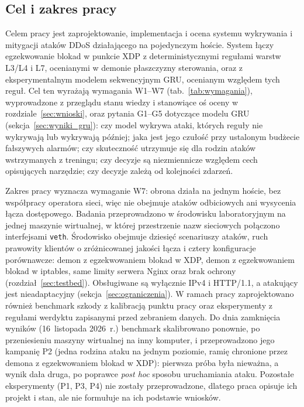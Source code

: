 \documentclass[a4paper,12pt]{article}
\begin{document}
\subsection{Cel i zakres pracy}
Celem pracy jest zaprojektowanie, implementacja i ocena systemu wykrywania i mitygacji ataków DDoS działającego na pojedynczym hoście. System łączy egzekwowanie blokad w punkcie XDP z deterministycznymi regułami warstw L3/L4 i L7, ocenianymi w demonie płaszczyzny sterowania, oraz z eksperymentalnym modelem sekwencyjnym GRU, ocenianym względem tych reguł. Cel ten wyrażają wymagania W1--W7 (tab.~\ref{tab:wymagania}), wyprowadzone z przeglądu stanu wiedzy i stanowiące oś oceny w rozdziale~\ref{sec:wnioski}, oraz pytania G1--G5 dotyczące modelu GRU (sekcja~\ref{sec:wyniki_gru}): czy model wykrywa ataki, których reguły nie wykrywają lub wykrywają później; jaka jest jego czułość przy ustalonym budżecie fałszywych alarmów; czy skuteczność utrzymuje się dla rodzin ataków wstrzymanych z treningu; czy decyzje są niezmiennicze względem cech opisujących narzędzie; czy decyzje zależą od kolejności zdarzeń.

Zakres pracy wyznacza wymaganie W7: obrona działa na jednym hoście, bez współpracy operatora sieci, więc nie obejmuje ataków odbiciowych ani wysycenia łącza dostępowego. Badania przeprowadzono w środowisku laboratoryjnym na jednej maszynie wirtualnej, w której przestrzenie nazw sieciowych połączono interfejsami \texttt{veth}. Środowisko obejmuje dziesięć scenariuszy ataków, ruch prawowity klientów o zróżnicowanej jakości łącza i cztery konfiguracje porównawcze: demon z egzekwowaniem blokad w XDP, demon z egzekwowaniem blokad w iptables, same limity serwera Nginx oraz brak ochrony (rozdział~\ref{sec:testbed}). Obsługiwane są wyłącznie IPv4 i HTTP/1.1, a atakujący jest nieadaptacyjny (sekcja~\ref{sec:ograniczenia}). W ramach pracy zaprojektowano również benchmark szkody z kalibracją punktu pracy oraz eksperymenty z regułami werdyktu zapisanymi przed zebraniem danych. Do dnia zamknięcia wyników (16~listopada 2026~r.) benchmark skalibrowano ponownie, po przeniesieniu maszyny wirtualnej na inny komputer, i przeprowadzono jego kampanię P2 (jedna rodzina ataku na jednym poziomie, ramię chronione przez demona z egzekwowaniem blokad w XDP): pierwsza próba była nieważna, a wynik dała druga, po poprawce \textit{post hoc} sposobu uruchamiania ataku. Pozostałe eksperymenty (P1, P3, P4) nie zostały przeprowadzone, dlatego praca opisuje ich projekt i stan, ale nie formułuje na ich podstawie wniosków.
\end{document}
